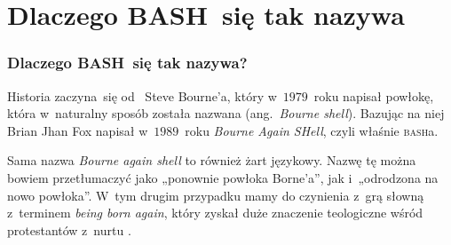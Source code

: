 \documentclass[10pt,t]{beamer}
\begin{document}
\appendix















\section{Dlaczego BASH~się tak nazywa}



\begin{frame}
  \frametitle{Dlaczego BASH~się tak nazywa?}


  Historia zaczyna~się
  od~
  {Steve Bourne’a}, który w~$1979$~roku napisał powłokę, która w~naturalny
  sposób została nazwana
  (ang.~\textit{Bourne shell}). Bazując na niej
  {Brian Jhan Fox} napisał w~$1989$~roku \textit{Bourne Again SHell},
  czyli właśnie
  {\textsc{bash}a}.

  Sama nazwa \textit{Bourne again shell} to również żart językowy. Nazwę tę
  można bowiem przetłumaczyć jako „ponownie powłoka Borne’a”, jak
  i~„odrodzona na nowo powłoka”. W~tym drugim przypadku mamy do czynienia
  z~grą słowną z~terminem
  {\textit{being born again}}, który zyskał
  duże znaczenie teologiczne wśród protestantów z~nurtu
  .

\end{frame}
















\printbibliography





\end{document}
